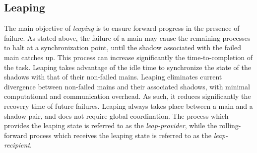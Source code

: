 \subsection{Leaping}

The main objective of \textit{leaping} is to ensure forward progress in the presence of failure. As stated above, the failure of a main may cause the remaining processes to halt at a synchronization point, until the shadow associated with the failed main catches up. This process can increase significantly the time-to-completion of the task. Leaping takes  advantage of the idle time to synchronize the state of the shadows with that of their non-failed mains. 
Leaping eliminates current divergence between non-failed mains and their associated shadows, with minimal computational and communication overhead. As such, it reduces significantly the recovery time of future failures. 
Leaping always takes place between a main and a shadow pair, and does not require global coordination. The process which provides the leaping state is referred to as the 
\textit{leap-provider},  while the rolling-forward process which receives the leaping state is referred to as the \textit{leap-recipient}. 




